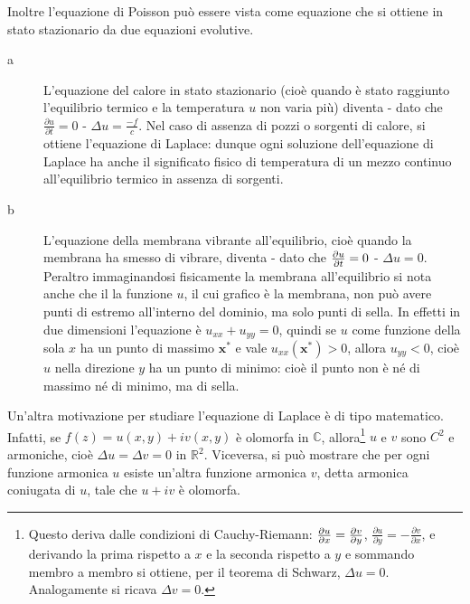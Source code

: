 \documentclass{article}
\begin{document}
Inoltre l'equazione di Poisson pu\`{o} essere vista come equazione che si
ottiene in stato stazionario da due equazioni evolutive.

\begin{description}
\item[a] L'equazione del calore in stato stazionario (cio\`{e} quando \`{e}
stato raggiunto l'equilibrio termico e la temperatura $u$ non varia pi\`{u})
diventa - dato che $\frac{\partial u}{\partial t}=0$ - $\Delta u=\frac{-f}{c}
$. Nel caso di assenza di pozzi o sorgenti di calore, si ottiene l'equazione
di Laplace: dunque ogni soluzione dell'equazione di Laplace ha anche il
significato fisico di temperatura di un mezzo continuo all'equilibrio
termico in assenza di sorgenti.

\item[b] L'equazione della membrana vibrante all'equilibrio, cio\`{e} quando
la membrana ha smesso di vibrare, diventa - dato che $\frac{\partial u}{%
\partial t}=0$ - $\Delta u=0$. Peraltro immaginandosi fisicamente la
membrana all'equilibrio si nota anche che il la funzione $u$, il cui grafico 
\`{e} la membrana, non pu\`{o} avere punti di estremo all'interno del
dominio, ma solo punti di sella. In effetti in due dimensioni l'equazione 
\`{e} $u_{xx}+u_{yy}=0$, quindi se $u$ come funzione della sola $x$ ha un
punto di massimo $\mathbf{x}^{\ast }$ e vale $u_{xx}\left( \mathbf{x}^{\ast
}\right) >0$, allora $u_{yy}<0$, cio\`{e} $u$ nella direzione $y$ ha un
punto di minimo: cio\`{e} il punto non \`{e} n\'{e} di massimo n\'{e} di
minimo, ma di sella.
\end{description}

Un'altra motivazione per studiare l'equazione di Laplace \`{e} di tipo
matematico. Infatti, se $f\left( z\right) =u\left( x,y\right) +iv\left(
x,y\right) $ \`{e} olomorfa in $%
\mathbb{C}
$, allora\footnote{%
Questo deriva dalle condizioni di Cauchy-Riemann: $\frac{\partial u}{%
\partial x}=\frac{\partial v}{\partial y}$, $\frac{\partial u}{\partial y}=-%
\frac{\partial v}{\partial x}$, e derivando la prima rispetto a $x$ e la
seconda rispetto a $y$ e sommando membro a membro si ottiene, per il teorema
di Schwarz, $\Delta u=0$. Analogamente si ricava $\Delta v=0$.} $u$ e $v$
sono $C^{2}$ e armoniche, cio\`{e} $\Delta u=\Delta v=0$ in $%
\mathbb{R}
^{2}$. Viceversa, si pu\`{o} mostrare che per ogni funzione armonica $u$
esiste un'altra funzione armonica $v$, detta armonica coniugata di $u$, tale
che $u+iv$ \`{e} olomorfa.
\end{document}
